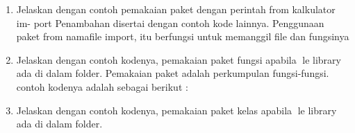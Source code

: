 \begin{enumerate}
\begin{itemize}
    \end{itemize}
    

    \item Jelaskan dengan contoh pemakaian paket dengan perintah from kalkulator im-
    port Penambahan disertai dengan contoh kode lainnya.
    Penggunaan paket from namafile import, itu berfungsi untuk memanggil file dan fungsinya
    

    \item Jelaskan dengan contoh kodenya, pemakaian paket fungsi apabila le library
    ada di dalam folder.
    Pemakaian paket adalah perkumpulan fungsi-fungsi. contoh kodenya adalah sebagai berikut :
    

    \item Jelaskan dengan contoh kodenya, pemakaian paket kelas apabila le library ada
    di dalam folder.
    

\end{enumerate}
